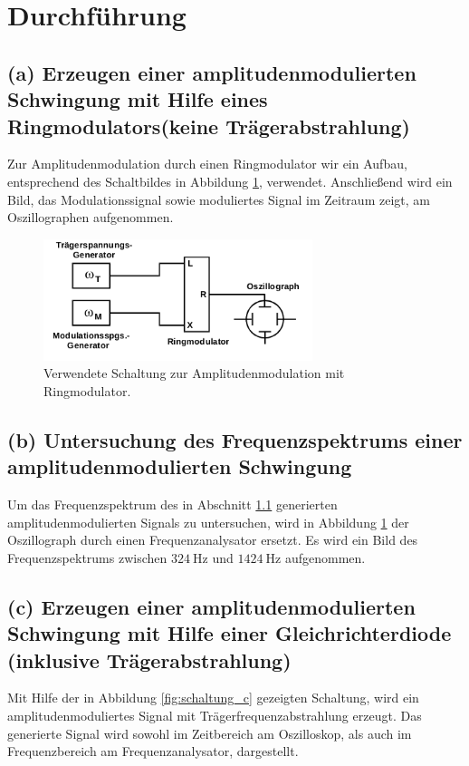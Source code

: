 \section{Durchführung}
\label{sec:Durchführung}

\subsection{(a) Erzeugen einer amplitudenmodulierten Schwingung mit
Hilfe eines Ringmodulators(keine Trägerabstrahlung)}
\label{subsec:durchfuehrung_a}
Zur Amplitudenmodulation durch einen Ringmodulator wir ein Aufbau,
entsprechend des Schaltbildes in Abbildung \ref{fig:schaltung_a}, verwendet.
Anschließend wird ein Bild, das Modulationssignal sowie moduliertes
Signal im Zeitraum zeigt, am Oszillographen aufgenommen.

\begin{figure}
  \centering
  \includegraphics[width=0.7\textwidth]{figures/a_d.png}
  \caption{Verwendete Schaltung zur Amplitudenmodulation mit Ringmodulator.\cite{sample}}
  \label{fig:schaltung_a}
\end{figure}


\subsection{(b) Untersuchung des Frequenzspektrums einer
amplitudenmodulierten Schwingung}
\label{subsec:durchfuehrung_b}
Um das Frequenzspektrum des in Abschnitt \ref{subsec:durchfuehrung_a} generierten
amplitudenmodulierten Signals zu untersuchen, wird in Abbildung
\ref{fig:schaltung_a} der Oszillograph durch einen Frequenzanalysator ersetzt.
Es wird ein Bild des Frequenzspektrums zwischen $\SI{324}{\hertz}$ und $\SI{1424}{\hertz}$
aufgenommen.


\subsection{(c) Erzeugen einer amplitudenmodulierten Schwingung
mit Hilfe einer Gleichrichterdiode (inklusive Trägerabstrahlung)}
\label{subsec:durchfuehrung_c}
Mit Hilfe der in Abbildung \ref{fig:schaltung_c} gezeigten Schaltung,
wird ein amplitudenmoduliertes Signal mit Trägerfrequenzabstrahlung erzeugt.
Das generierte Signal wird sowohl im Zeitbereich am Oszilloskop, als auch
im Frequenzbereich am Frequenzanalysator, dargestellt.

